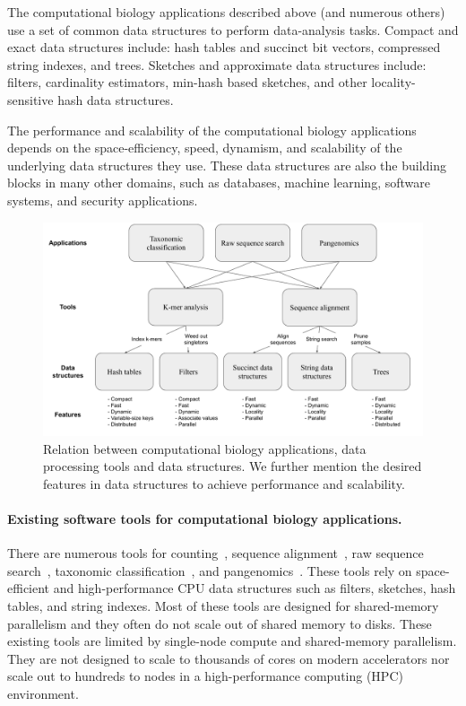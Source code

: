 The computational biology applications described above (and numerous others)  use a set of common data structures to perform data-analysis tasks.
Compact and exact data structures include: hash tables and succinct bit vectors, compressed string indexes, and trees.
Sketches and approximate data structures include: filters, cardinality estimators,  min-hash based sketches, and other locality-sensitive hash data structures.

The performance and scalability of the computational biology applications
depends on the space-efficiency, speed, dynamism, and scalability of the
underlying data structures they use. These data structures are also the building blocks in many other domains, such as databases, machine learning, software systems, and security applications.

\begin{figure}
\centering
\includegraphics[width=1.0\textwidth]{images/PPOSS_App_DS}
\caption{Relation between computational biology applications, data processing tools and data structures. We further mention the desired features in data structures to achieve performance and scalability.}
\label{fig1}
\end{figure}


\paragraph{Existing software tools for computational biology applications.}

There are numerous tools for \kmer counting~\cite{MarccaisKi11,PandeyBJP17a}, sequence alignment~\cite{altschul1990basic,kielbasa2011adaptive,li2018minimap2,schwartz2003human}, raw sequence search~\cite{solomon2016fast,PandeyABFJP18Cell}, taxonomic classification~\cite{wood2014kraken,wood2019improved}, and pangenomics~\cite{garrison2018variation,pandey2021variantstore}. These tools rely on space-efficient and high-performance CPU data structures such as filters, sketches, hash tables, and string indexes. Most of these tools are designed for shared-memory parallelism and they often do not scale out of shared memory to disks.
These existing tools are limited by single-node compute and shared-memory parallelism. They are not designed to scale to thousands of cores on modern accelerators nor scale out to hundreds to nodes in a high-performance computing (HPC) environment.
%


